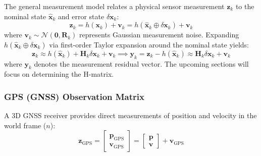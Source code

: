 \documentclass{article}
\begin{document}
	The general measurement model relates a physical sensor measurement $\mathbf{z}_k$ to the nominal state $\hat{\mathbf{x}}_k$ and error state $\delta\mathbf{x}_k$:
	\begin{equation*}
		\mathbf{z}_k = h(\mathbf{x}_k) + \mathbf{v}_k = h(\hat{\mathbf{x}}_k \oplus \delta\mathbf{x}_k) + \mathbf{v}_k
	\end{equation*}
	where $\mathbf{v}_k \sim \mathcal{N}(\mathbf{0}, \mathbf{R}_k)$ represents Gaussian measurement noise. Expanding $h(\hat{\mathbf{x}}_k \oplus \delta\mathbf{x}_k)$ via first-order Taylor expansion around the nominal state yields:
	\begin{equation*}
		\mathbf{z}_k \approx h(\hat{\mathbf{x}}_k) + \mathbf{H}_k \delta\mathbf{x}_k + \mathbf{v}_k \implies \mathbf{y}_k = \mathbf{z}_k - h(\hat{\mathbf{x}}_k) \approx \mathbf{H}_k \delta\mathbf{x}_k + \mathbf{v}_k
	\end{equation*}
	where $\mathbf{y}_k$ denotes the measurement residual vector. The upcoming sections will focus on determining the H-matrix.
	
	\subsubsection{GPS (GNSS) Observation Matrix}
	A 3D GNSS receiver provides direct measurements of position and velocity in the world frame ($n$):
	\begin{equation*}
		\mathbf{z}_{\text{GPS}} = 
		\begin{bmatrix} 
			\mathbf{p}_{\text{GPS}} \\ 
			\mathbf{v}_{\text{GPS}} 
		\end{bmatrix} = 
		\begin{bmatrix} 
			\mathbf{p} \\ 
			\mathbf{v} 
		\end{bmatrix} + \mathbf{v}_{\text{GPS}}
	\end{equation*}
	
\end{document}
